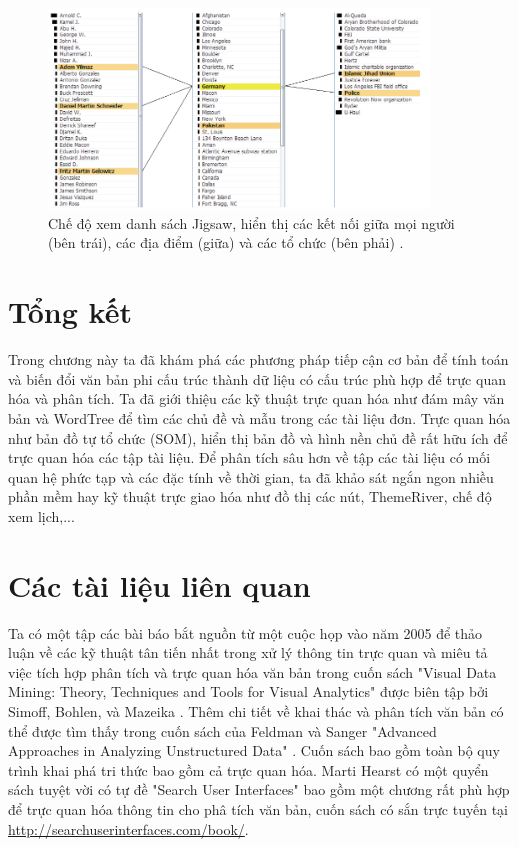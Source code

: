 \documentclass[14pt, a4paper]{article}
\numberwithin{equation}{section}
\numberwithin{figure}{section}
\numberwithin{dl}{section}
\numberwithin{md}{section}
\numberwithin{bd}{section}
\numberwithin{dn}{section}
\numberwithin{hq}{section}
\begin{document}
    \begin{figure}[h!]
        \centering
        \includegraphics[width=0.9\textwidth]{20.png}
        \caption{Chế độ xem danh sách Jigsaw, hiển thị các kết nối giữa mọi người (bên trái), các địa điểm (giữa) và các tổ chức (bên phải) \cite{155}.}
        \label{fig:20}
    \end{figure}

    \section{Tổng kết}

    Trong chương này ta đã khám phá các phương pháp tiếp cận cơ bản để tính toán và biến đổi văn bản phi cấu trúc thành dữ liệu có cấu trúc phù hợp để trực quan hóa và phân tích.
    Ta đã giới thiệu các kỹ thuật trực quan hóa như đám mây văn bản và WordTree để tìm các chủ đề và mẫu trong các tài liệu đơn.
    Trực quan hóa như bản đồ tự tổ chức (SOM), hiển thị bản đồ và hình nền chủ đề rất hữu ích để trực quan hóa các tập tài liệu.
    Để phân tích sâu hơn về tập các tài liệu có mối quan hệ phức tạp và các đặc tính về thời gian, ta đã khảo sát ngắn ngon nhiều phần mềm hay kỹ thuật trực giao hóa như đồ thị các nút, ThemeRiver, chế độ xem lịch,...

    \section{Các tài liệu liên quan}

    Ta có một tập các bài báo bắt nguồn từ một cuộc họp vào năm 2005 để thảo luận về các kỹ thuật tân tiến nhất trong xử lý thông tin trực quan và miêu tả việc tích hợp phân tích và trực quan hóa văn bản trong cuốn sách "Visual Data Mining: Theory, Techniques and Tools for Visual Analytics" được biên tập bởi Simoff, Bohlen, và Mazeika \cite{379}.
    Thêm chi tiết về khai thác và phân tích văn bản có thể được tìm thấy trong cuốn sách của Feldman và Sanger "Advanced Approaches in Analyzing Unstructured Data" \cite{122}.
    Cuốn sách bao gồm toàn bộ quy trình khai phá tri thức bao gồm cả trực quan hóa.
    Marti Hearst có một quyển sách tuyệt vời có tự đề "Search User Interfaces" \cite{179} bao gồm một chương rất phù hợp để trực quan hóa thông tin cho phâ tích văn bản, cuốn sách có sắn trực tuyến tại \url{http://searchuserinterfaces.com/book/}.
    
    \newpage
    \printbibliography[title={TÀI LIỆU THAM KHẢO}]
\end{document}
